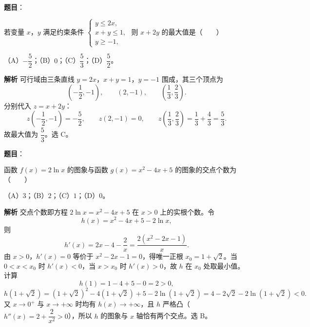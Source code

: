 \begin{answer}

\textbf{题目}：

若变量 $x$，$y$ 满足约束条件 $\begin{cases}y\leqslant 2x,\\x+y\leqslant 1,\\y\geqslant -1,\end{cases}$ 则 $x+2y$ 的最大值是\mbox{（　　）}

（A）$-\dfrac52$；（B）$0$；（C）$\dfrac53$；（D）$\dfrac52$。

\textbf{解析}
可行域由三条直线 $y=2x$，$x+y=1$，$y=-1$ 围成，其三个顶点为
\nopagebreak[4]
\[\left(-\frac12,-1\right),\qquad (2,-1),\qquad \left(\frac13,\frac23\right).\]
分别代入 $z=x+2y$：
\nopagebreak[4]
\[z\left(-\frac12,-1\right)=-\frac52,\qquad z(2,-1)=0,\qquad z\left(\frac13,\frac23\right)=\frac13+\frac43=\frac53.\]
故最大值为 $\dfrac53$。选 C。


\end{answer}
\begin{answer}

\textbf{题目}：

函数 $f(x)=2\ln x$ 的图象与函数 $g(x)=x^2-4x+5$ 的图象的交点个数为\mbox{（　　）}

（A）$3$；（B）$2$；（C）$1$；（D）$0$。

\textbf{解析}
交点个数即方程 $2\ln x=x^2-4x+5$ 在 $x>0$ 上的实根个数。令
\nopagebreak[4]
\[h(x)=x^2-4x+5-2\ln x,\]
则
\nopagebreak[4]
\[h'(x)=2x-4-\frac2x=\frac{2(x^2-2x-1)}{x}.\]
由 $x>0$，$h'(x)=0$ 等价于 $x^2-2x-1=0$，得唯一正根 $x_0=1+\sqrt2$。当 $0<x<x_0$ 时 $h'(x)<0$，当 $x>x_0$ 时 $h'(x)>0$，故 $h$ 在 $x_0$ 处取最小值。计算
\nopagebreak[4]
\[h(1)=1-4+5-0=2>0,\]
\nopagebreak[4]
\[h(1+\sqrt2)=(1+\sqrt2)^2-4(1+\sqrt2)+5-2\ln(1+\sqrt2)
=4-2\sqrt2-2\ln(1+\sqrt2)<0.\]
又 $x\to0^+$ 与 $x\to+\infty$ 时均有 $h(x)\to+\infty$，且 $h$ 严格凸（$h''(x)=2+\dfrac2{x^2}>0$），所以 $h$ 的图象与 $x$ 轴恰有两个交点。选 B。


\end{answer}
